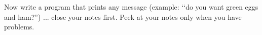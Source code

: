 Now write a program that prints any message 
(example: \lq\lq do you want green eggs and ham?'') ... 
close your notes first. Peek at your notes only when you have problems.
